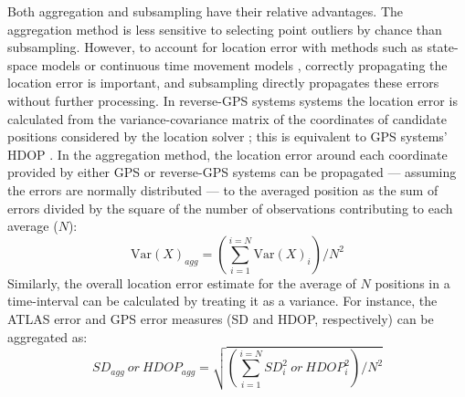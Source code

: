 \begin{refsection}[sorting=nyt]
    Both aggregation and subsampling have their relative advantages. 
    The aggregation method is less sensitive to selecting point outliers by chance than subsampling.
    However, to account for location error with methods such as state-space models \citep{jonsen2003, jonsen2005, johnson2008} or continuous time movement models \citep{fleming2014a, noonan2019, gurarie2017, calabrese2016, fleming2020}, correctly propagating the location error is important, and subsampling directly propagates these errors without further processing.
    In reverse-GPS systems systems the location error is calculated from the variance-covariance matrix of the coordinates of candidate positions considered by the location solver \citep{weiser2016}; this is equivalent to GPS systems' HDOP \citep{ranacher2016}.
    In the aggregation method, the location error around each coordinate provided by either GPS or reverse-GPS systems can be propagated --- assuming the errors are normally distributed --- to the averaged position as the sum of errors divided by the square of the number of observations contributing to each average ($N$):
        $$
            \text{Var}(X)_{agg} = \left( \sum_{i=1}^{i=N} \text{Var}(X)_i \right) / N ^ 2
        $$
    Similarly, the overall location error estimate for the average of $N$ positions in a time-interval can be calculated by treating it as a variance. For instance, the ATLAS error and GPS error measures (SD and HDOP, respectively) can be aggregated as:
        $$
            SD_{agg} \ or \ HDOP_{agg} = \sqrt{ \left( \sum_{i=1}^{i=N} SD_i^2 \ or \ HDOP_i^2 \right) / N ^ 2  }
        $$


\end{refsection}
